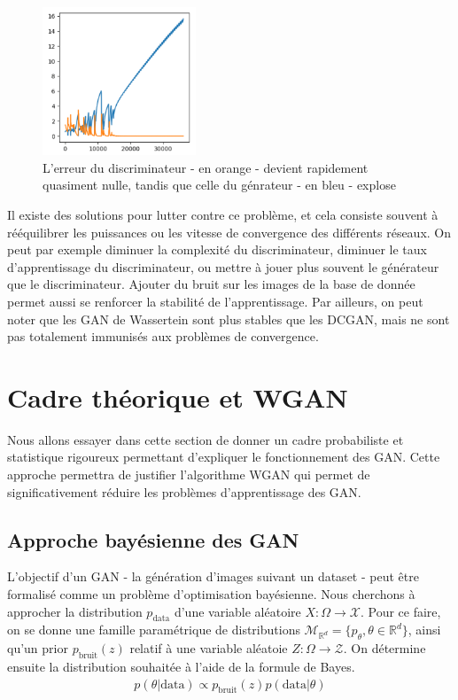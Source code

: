 \begin{figure}[!h]
\centering

\includegraphics[width=130pt]{"images/GAN/failure3"}
\caption{L'erreur du discriminateur - en orange - devient rapidement quasiment nulle, tandis que celle du génrateur - en bleu - explose}
\label{perte_eq}
\end{figure}


Il existe des solutions pour lutter contre ce problème, et cela consiste souvent à rééquilibrer les puissances ou les vitesse de convergence des différents réseaux. On peut par exemple diminuer la complexité du discriminateur, diminuer le taux d'apprentissage du discriminateur, ou mettre à jouer plus souvent le générateur que le discriminateur.
Ajouter du bruit sur les images de la base de donnée permet aussi se renforcer la stabilité de l'apprentissage. Par ailleurs, on peut noter que les GAN de Wassertein sont plus stables que les DCGAN, mais ne sont pas totalement immunisés aux problèmes de convergence.

\section{Cadre théorique et WGAN}
Nous allons essayer dans cette section de donner un cadre probabiliste et statistique rigoureux permettant d'expliquer le fonctionnement des GAN. Cette approche permettra de justifier l'algorithme WGAN qui permet de significativement réduire les problèmes d'apprentissage des GAN.

\subsection{Approche bayésienne des GAN}
L'objectif d'un GAN - la génération d'images suivant un dataset - peut être formalisé comme un problème d'optimisation bayésienne. Nous cherchons à approcher la distribution $p_{\mathrm{data}}$ d'une variable aléatoire $X: \Omega \longrightarrow \mathcal{X}$. Pour ce faire, on se donne une famille paramétrique de distributions $\mathcal{M}_{\mathbb{R}^{d}} = \{p_{\theta}, \theta \in \mathbb{R}^d\}$, ainsi qu'un prior $p_{\mathrm{bruit}}(z)$ relatif à une variable aléatoie $Z : \Omega \longrightarrow \mathcal{Z}$. On détermine ensuite la distribution souhaitée à l'aide de la formule de Bayes. $$\begin{aligned} p(\theta | \mathrm{data}) \propto p_{\mathrm{bruit}}(z)p(\mathrm{data}|\theta)\end{aligned}$$

